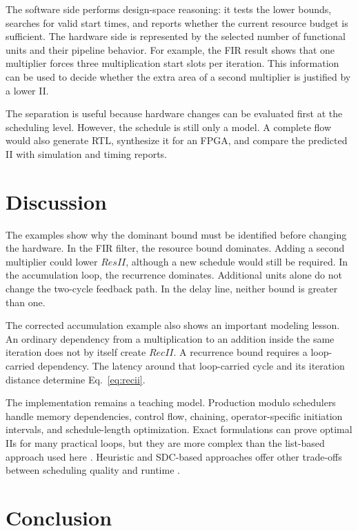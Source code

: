 \documentclass[conference]{IEEEtran}
\begin{document}
The software side performs design-space reasoning: it tests the lower bounds,
searches for valid start times, and reports whether the current resource budget is
sufficient. The hardware side is represented by the selected number of functional
units and their pipeline behavior. For example, the FIR result shows that one
multiplier forces three multiplication start slots per iteration. This information
can be used to decide whether the extra area of a second multiplier is justified by
a lower II.

The separation is useful because hardware changes can be evaluated first at the
scheduling level. However, the schedule is still only a model. A complete flow
would also generate RTL, synthesize it for an FPGA, and compare the predicted II
with simulation and timing reports.

\section{Discussion}

The examples show why the dominant bound must be identified before changing the
hardware. In the FIR filter, the resource bound dominates. Adding a second
multiplier could lower $ResII$, although a new schedule would still be required.
In the accumulation loop, the recurrence dominates. Additional units alone do not
change the two-cycle feedback path. In the delay line, neither bound is greater
than one.

The corrected accumulation example also shows an important modeling lesson.
An ordinary dependency from a multiplication to an addition inside the same
iteration does not by itself create $RecII$. A recurrence bound requires a
loop-carried dependency. The latency around that loop-carried cycle and its
iteration distance determine Eq.~\eqref{eq:recii}.

The implementation remains a teaching model. Production modulo schedulers handle
memory dependencies, control flow, chaining, operator-specific initiation
intervals, and schedule-length optimization. Exact formulations can prove optimal
IIs for many practical loops, but they are more complex than the list-based
approach used here \cite{oppermann2019}. Heuristic and SDC-based approaches offer
other trade-offs between scheduling quality and runtime \cite{zhang2013}.

\balance
\section{Conclusion}
\end{document}
